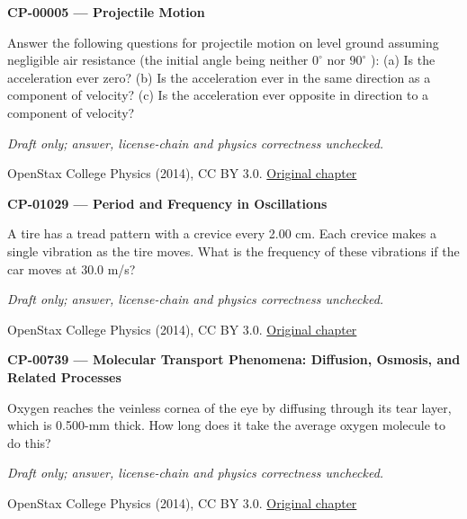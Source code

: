 \par\medskip
\noindent\textbf{CP-00005 — Projectile Motion}
\par Answer the following questions for projectile motion on level ground assuming negligible air resistance (the initial angle being neither $0^{\circ}$ nor $90^{\circ}$ ): (a) Is the acceleration ever zero? (b) Is the acceleration ever in the same direction as a component of velocity? (c) Is the acceleration ever opposite in direction to a component of velocity?
\par\smallskip
\textit{Draft only; answer, license-chain and physics correctness unchecked.}
\par{\footnotesize OpenStax College Physics (2014), CC BY 3.0. \href{https://github.com/philschatz/physics-book/blob/a7efaa7e221fab1694022d8bb98b83a73ee31d3d/contents/m42042.md}{Original chapter}}\par\normalsize

\par\medskip
\noindent\textbf{CP-01029 — Period and Frequency in Oscillations}
\par A tire has a tread pattern with a crevice every 2.00 cm. Each crevice makes a single vibration as the tire moves. What is the frequency of these vibrations if the car moves at 30.0 m/s?
\par\smallskip
\textit{Draft only; answer, license-chain and physics correctness unchecked.}
\par{\footnotesize OpenStax College Physics (2014), CC BY 3.0. \href{https://github.com/philschatz/physics-book/blob/a7efaa7e221fab1694022d8bb98b83a73ee31d3d/contents/m42241.md}{Original chapter}}\par\normalsize

\par\medskip
\noindent\textbf{CP-00739 — Molecular Transport Phenomena: Diffusion, Osmosis, and Related Processes}
\par Oxygen reaches the veinless cornea of the eye by diffusing through its tear layer, which is 0.500-mm thick. How long does it take the average oxygen molecule to do this?
\par\smallskip
\textit{Draft only; answer, license-chain and physics correctness unchecked.}
\par{\footnotesize OpenStax College Physics (2014), CC BY 3.0. \href{https://github.com/philschatz/physics-book/blob/a7efaa7e221fab1694022d8bb98b83a73ee31d3d/contents/m42212.md}{Original chapter}}\par\normalsize

